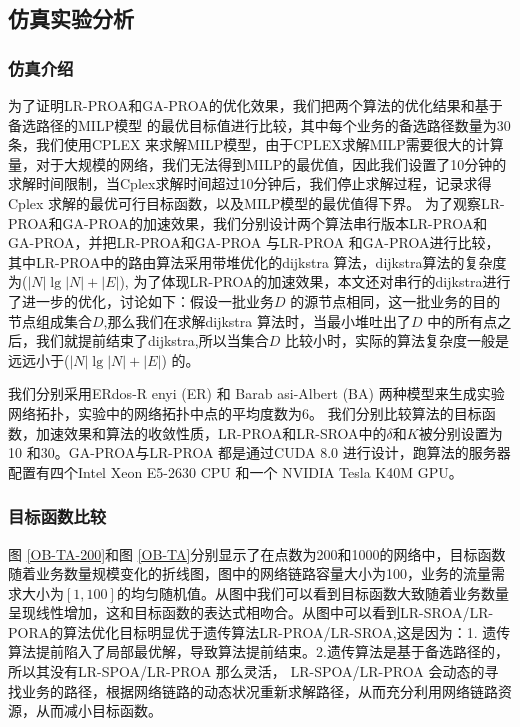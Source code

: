 \subsection{仿真实验分析}
\subsubsection {仿真介绍}

为了证明LR-PROA和GA-PROA的优化效果，我们把两个算法的优化结果和基于备选路径的MILP模型 的最优目标值进行比较，其中每个业务的备选路径数量为30条，我们使用CPLEX 来求解MILP模型，由于CPLEX求解MILP需要很大的计算量，对于大规模的网络，我们无法得到MILP的最优值，因此我们设置了10分钟的求解时间限制，当Cplex求解时间超过10分钟后，我们停止求解过程，记录求得Cplex 求解的最优可行目标函数，以及MILP模型的最优值得下界。
为了观察LR-PROA和GA-PROA的加速效果，我们分别设计两个算法串行版本LR-PROA和GA-PROA，并把LR-PROA和GA-PROA 与LR-PROA 和GA-PROA进行比较，其中LR-PROA中的路由算法采用带堆优化的dijkstra 算法，dijkstra算法的复杂度为($|N|\lg |N| +|E|$), 为了体现LR-PROA的加速效果，本文还对串行的dijkstra进行了进一步的优化，讨论如下：假设一批业务$D$ 的源节点相同，这一批业务的目的节点组成集合$D$,那么我们在求解dijkstra 算法时，当最小堆吐出了$D$ 中的所有点之后，我们就提前结束了dijkstra,所以当集合$D$ 比较小时，实际的算法复杂度一般是远远小于($|N|\lg |N| +|E|$) 的。

我们分别采用ERdos-R enyi (ER) 和 Barab asi-Albert (BA) 两种模型来生成实验网络拓扑，实验中的网络拓扑中点的平均度数为6。 我们分别比较算法的目标函数，加速效果和算法的收敛性质，LR-PROA和LR-SROA中的$\delta$和$K$被分别设置为10 和30。GA-PROA与LR-PROA 都是通过CUDA 8.0 进行设计，跑算法的服务器配置有四个Intel Xeon E5-2630 CPU 和一个 NVIDIA Tesla K40M GPU。
\subsubsection{目标函数比较}
图 \ref{OB-TA-200}和图 \ref{OB-TA}分别显示了在点数为200和1000的网络中，目标函数随着业务数量规模变化的折线图，图中的网络链路容量大小为100，业务的流量需求大小为$[1,100]$的均匀随机值。从图中我们可以看到目标函数大致随着业务数量呈现线性增加，这和目标函数的表达式相吻合。从图中可以看到LR-SROA/LR-PORA的算法优化目标明显优于遗传算法LR-PROA/LR-SROA,这是因为：1. 遗传算法提前陷入了局部最优解，导致算法提前结束。2.遗传算法是基于备选路径的，所以其没有LR-SPOA/LR-PROA 那么灵活， LR-SPOA/LR-PROA 会动态的寻找业务的路径，根据网络链路的动态状况重新求解路径，从而充分利用网络链路资源，从而减小目标函数。

